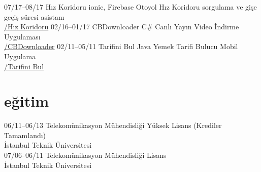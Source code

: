 \documentclass[]{friggeri-cv} %
\begin{document}
\begin{entrylist}
\entry
{07/17--08/17}
{Hız Koridoru}
{ionic, Firebase}
{Otoyol Hız Koridoru sorgulama ve gişe geçiş süresi asistanı
\\\href{https://play.google.com/store/apps/details?id=com.harunsokullu.speedcorridor}{\faAndroid/Hız Koridoru}}
\entry
{02/16--01/17}
{CBDownloader}
{C\#}
{Canlı Yayın Video İndirme Uygulaması
\\\href{https://github.com/suphero/CBDownloader}{\faGithub/CBDownloader}}
\entry
{02/11--05/11}
{Tarifini Bul}
{Java}
{Yemek Tarifi Bulucu Mobil Uygulama
\\\href{https://play.google.com/store/apps/details?id=com.tarifinibul}{\faAndroid/Tarifini Bul}}

\end{entrylist}

\section{eğitim}

\begin{entrylist}

\entry
{06/11--06/13}
{Telekomünikasyon Mühendisliği}{}
{Yüksek Lisans (Krediler Tamamlandı)
\\İstanbul Teknik Üniversitesi}
\\
\entry
{07/06--06/11}
{Telekomünikasyon Mühendisliği}{}
{Lisans
\\İstanbul Teknik Üniversitesi}
	
\end{entrylist}
\end{document}
